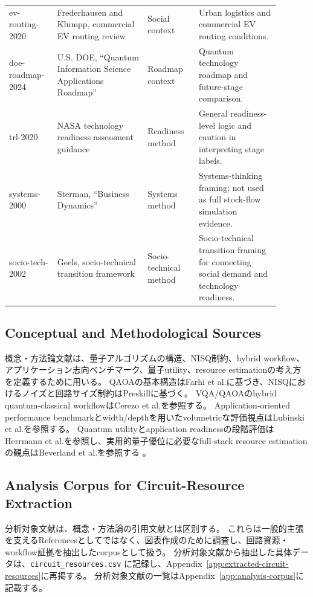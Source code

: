\begin{longtable}{>{\raggedright\arraybackslash}p{0.15\linewidth}>{\raggedright\arraybackslash}p{0.30\linewidth}>{\raggedright\arraybackslash}p{0.17\linewidth}>{\raggedright\arraybackslash}p{0.27\linewidth}}
ev-routing-2020 & Frederhausen and Klumpp, commercial EV routing review & Social context & Urban logistics and commercial EV routing conditions. \\
doe-roadmap-2024 & U.S. DOE, ``Quantum Information Science Applications Roadmap'' & Roadmap context & Quantum technology roadmap and future-stage comparison. \\
trl-2020 & NASA technology readiness assessment guidance & Readiness method & General readiness-level logic and caution in interpreting stage labels. \\
systems-2000 & Sterman, ``Business Dynamics'' & Systems method & Systems-thinking framing; not used as full stock-flow simulation evidence. \\
socio-tech-2002 & Geels, socio-technical transition framework & Socio-technical method & Socio-technical transition framing for connecting social demand and technology readiness. \\
\bottomrule
\end{longtable}
\endgroup

\subsection{Conceptual and Methodological Sources}

概念・方法論文献は、量子アルゴリズムの構造、NISQ制約、hybrid workflow、アプリケーション志向ベンチマーク、量子utility、resource estimationの考え方を定義するために用いる。
QAOAの基本構造はFarhi et al.に基づき、NISQにおけるノイズと回路サイズ制約はPreskillに基づく。
VQA/QAOAのhybrid quantum-classical workflowはCerezo et al.を参照する。
Application-oriented performance benchmarkとwidth/depthを用いたvolumetricな評価視点はLubinski et al.を参照する。
Quantum utilityとapplication readinessの段階評価はHerrmann et al.を参照し、実用的量子優位に必要なfull-stack resource estimationの観点はBeverland et al.を参照する
\cite{farhi2014qaoa,preskill2018nisq,cerezo2021vqa,lubinski2021applicationbenchmarks,lubinski2024optimizationbenchmarks,lubinski2024applicationbenchmarks,herrmann2023quantumutility,beverland2022practicaladvantage}。

\subsection{Analysis Corpus for Circuit-Resource Extraction}

分析対象文献は、概念・方法論の引用文献とは区別する。
これらは一般的主張を支えるReferencesとしてではなく、図表作成のために調査し、回路資源・workflow証拠を抽出したcorpusとして扱う。
分析対象文献から抽出した具体データは、\texttt{circuit\_resources.csv} に記録し、Appendix~\ref{app:extracted-circuit-resources}に再掲する。
分析対象文献の一覧はAppendix~\ref{app:analysis-corpus}に記載する。

